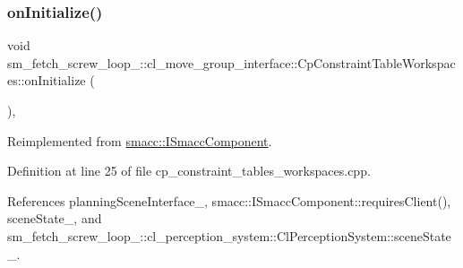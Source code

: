 \subsubsection{\texorpdfstring{on\+Initialize()}{onInitialize()}}
{\footnotesize\ttfamily void sm\+\_\+fetch\+\_\+screw\+\_\+loop\+\_\+::cl\+\_\+move\+\_\+group\+\_\+interface\+::\+Cp\+Constraint\+Table\+Workspaces\+::on\+Initialize (\begin{DoxyParamCaption}{ }\end{DoxyParamCaption})\hspace{0.3cm}{\ttfamily [override]}, {\ttfamily [virtual]}}



Reimplemented from \hyperlink{classsmacc_1_1ISmaccComponent_ae6f71d008db12553912e9436184b9e65}{smacc\+::\+I\+Smacc\+Component}.



Definition at line 25 of file cp\+\_\+constraint\+\_\+tables\+\_\+workspaces.\+cpp.



References planning\+Scene\+Interface\+\_\+, smacc\+::\+I\+Smacc\+Component\+::requires\+Client(), scene\+State\+\_\+, and sm\+\_\+fetch\+\_\+screw\+\_\+loop\+\_\+::cl\+\_\+perception\+\_\+system\+::\+Cl\+Perception\+System\+::scene\+State\+\_\+.


